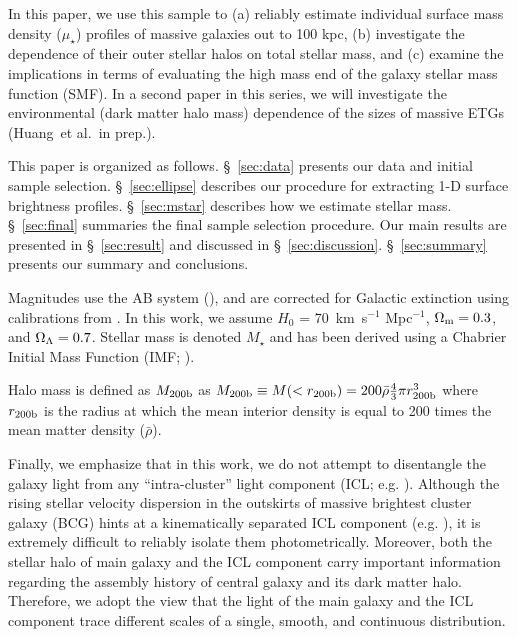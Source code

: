\documentclass[a4paper,fleqn,usenatbib]{mnras}
\def\etal{{\ et al.~}}
\def\redm{\texttt{redMaPPer}}
\def\mstar{{$M_{\star}$}}
\def\mden{{$\mu_{\star}$}}
\begin{document}
    
    In this paper, we use this sample to 
    (a) reliably estimate individual surface mass density (\mden{}) profiles of 
    massive galaxies out to 100 kpc, 
    (b) investigate the dependence of their outer stellar halos on total stellar 
    mass, and 
    (c) examine the implications in terms of evaluating the high mass end of the 
    galaxy stellar mass function (SMF). 
    In a second paper in this series, we will investigate the environmental 
    (dark matter halo mass) dependence of the sizes of massive ETGs 
    (Huang\etal in prep.).
    
    This paper is organized as follows. 
    \S~\ref{sec:data} presents our data and initial sample selection. 
    \S~\ref{sec:ellipse} describes our procedure for extracting 1-D surface 
    brightness profiles. 
    \S~\ref{sec:mstar} describes how we estimate stellar mass.
    \S~\ref{sec:final} summaries the final sample selection procedure. 
    Our main results are presented in \S~\ref{sec:result} and discussed in 
    \S~\ref{sec:discussion}. 
    \S~\ref{sec:summary} presents our summary and conclusions.

    Magnitudes use the AB system (\citealt{Oke1983}), and are corrected for Galactic 
    extinction using calibrations from \citet{Schlafly11}.
    In this work, we assume $H_0$ = 70~km~s$^{-1}$ Mpc$^{-1}$, ${\Omega}_{\rm m}=0.3$, 
    and ${\Omega}_{\rm \Lambda}=0.7$.
    Stellar mass is denoted \mstar{} and has been derived using a Chabrier Initial Mass 
    Function (IMF; \citealt{Chabrier2003}).   
      
    Halo mass is defined as $M_{\rm 200b}$ as 
    $M_{\rm 200b}\equiv M(<r_{\rm 200b})=200\bar{\rho} 
    \frac{4}{3}\pi r_{\rm 200b}^3$ where $r_{\rm 200b}$
    is the radius at which the mean interior density is equal to 200 times
    the mean matter density ($\bar{\rho}$). 
    
    Finally, we emphasize that in this work, we do not attempt to disentangle the 
    galaxy light from any ``intra-cluster'' light component (ICL; e.g. 
    \citealt{Carlberg1997, Lin2004, Gonzalez2005, Mihos2005}). 
    Although the rising stellar velocity dispersion in the outskirts of massive 
    brightest cluster galaxy (BCG)
    hints at a kinematically separated ICL component (e.g. 
    \citealt{Dressler1979, Carter1999, Kelson2002, Bender2015, Longobardi2015}),
    it is extremely difficult to reliably isolate them photometrically.
    Moreover, both the stellar halo of main galaxy and the ICL component carry 
    important information regarding the assembly history of central galaxy and its 
    dark matter halo. 
    Therefore, we adopt the view that the light of the main galaxy and the 
    ICL component trace different scales of a single, smooth, and continuous 
    distribution.
       
\end{document}
